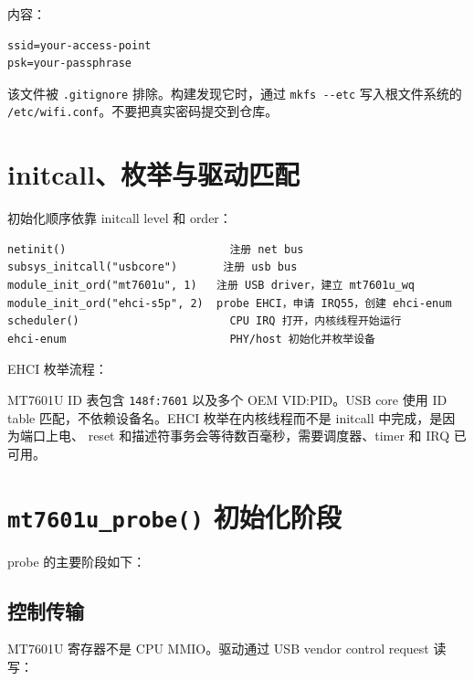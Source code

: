 内容：

\begin{lstlisting}
ssid=your-access-point
psk=your-passphrase
\end{lstlisting}

该文件被 \passthrough{\lstinline!.gitignore!} 排除。构建发现它时，通过
\passthrough{\lstinline!mkfs --etc!} 写入根文件系统的
\passthrough{\lstinline!/etc/wifi.conf!}。不要把真实密码提交到仓库。

\section{initcall、枚举与驱动匹配}\label{initcallux679aux4e3eux4e0eux9a71ux52a8ux5339ux914d}

初始化顺序依靠 initcall level 和 order：

\begin{lstlisting}
netinit()                         注册 net bus
subsys_initcall("usbcore")       注册 usb bus
module_init_ord("mt7601u", 1)   注册 USB driver，建立 mt7601u_wq
module_init_ord("ehci-s5p", 2)  probe EHCI，申请 IRQ55，创建 ehci-enum
scheduler()                       CPU IRQ 打开，内核线程开始运行
ehci-enum                         PHY/host 初始化并枚举设备
\end{lstlisting}

EHCI 枚举流程：



MT7601U ID 表包含 \passthrough{\lstinline!148f:7601!} 以及多个 OEM
VID:PID。USB core 使用 ID table 匹配，不依赖设备名。EHCI
枚举在内核线程而不是 initcall 中完成，是因为端口上电、 reset
和描述符事务会等待数百毫秒，需要调度器、timer 和 IRQ 已可用。

\section{\texorpdfstring{\texttt{mt7601u\_probe()}
初始化阶段}{mt7601u\_probe() 初始化阶段}}\label{mt7601u_probe-ux521dux59cbux5316ux9636ux6bb5}

probe 的主要阶段如下：



\subsection{控制传输}\label{ux63a7ux5236ux4f20ux8f93}

MT7601U 寄存器不是 CPU MMIO。驱动通过 USB vendor control request 读写：

